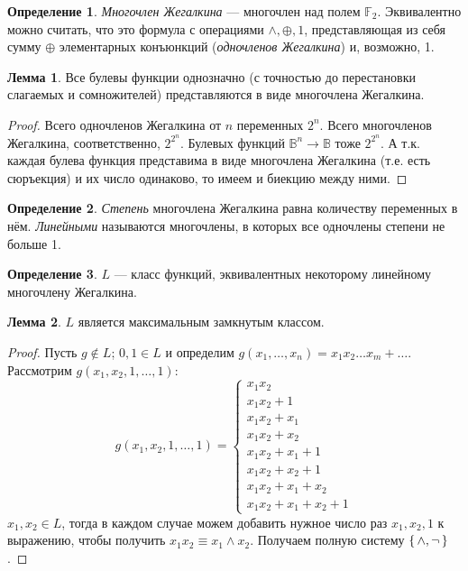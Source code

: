 \documentclass[12pt]{article}
\let\eq\equiv
\let\la\land
\let\n\neg
\let\nin\notin
\theoremstyle{definition}
\newtheorem{definition}{Определение}[section]
\theoremstyle{statement}
\theoremstyle{theorem}
\newtheorem{lemma}{Лемма}[section]
\begin{document}
\begin{definition}
  \textit{Многочлен Жегалкина} --- многочлен над полем
  $\mathbb{F}_2$. Эквивалентно можно считать, что это формула с
  операциями $\la, \oplus, 1$, представляющая из себя сумму $\oplus$
  элементарных конъюнкций (\textit{одночленов Жегалкина}) и, возможно, 1.
\end{definition}

\begin{lemma}
  Все булевы функции однозначно (с точностью до перестановки
  слагаемых и сомножителей) представляются в виде многочлена Жегалкина.
  \begin{proof}
    Всего одночленов Жегалкина от $n$ переменных $2^n$. Всего
    многочленов Жегалкина, соответственно, $2^{2^n}$. Булевых функций
    $\mathbb{B}^n \to \mathbb{B}$ тоже $2^{2^n}$. А т.к. каждая
    булева функция представима в виде многочлена Жегалкина (т.е. есть
    сюръекция) и их число одинаково, то имеем и биекцию между ними.
  \end{proof}
\end{lemma}

\begin{definition}
  \textit{Степень} многочлена Жегалкина равна количеству переменных в
  нём. \textit{Линейными} называются многочлены, в которых все
  одночлены степени не больше 1.
\end{definition}

\begin{definition}
  $L$ --- класс функций, эквивалентных некоторому линейному
  многочлену Жегалкина.
\end{definition}

\begin{lemma}
  $L$ является максимальным замкнутым классом.
  \begin{proof}
    Пусть $g \nin L$; $0, 1 \in L$ и определим $g(x_1, \dots, x_n) =
    x_1x_2\dots x_m + \dots$. Рассмотрим $g(x_1, x_2, 1, \dots, 1)$:
    \[
      g(x_1, x_2, 1, \dots, 1) =
      \begin{cases}
        x_1x_2\\
        x_1x_2 + 1\\
        x_1x_2 + x_1\\
        x_1x_2 + x_2\\
        x_1x_2 + x_1 + 1\\
        x_1x_2 + x_2 + 1\\
        x_1x_2 + x_1 + x_2\\
        x_1x_2 + x_1 + x_2 + 1
      \end{cases}
    \]
    $x_1, x_2 \in L$, тогда в каждом случае можем добавить нужное
    число раз $x_1, x_2, 1$ к выражению, чтобы получить $x_1x_2 \eq
    x_1 \land x_2$. Получаем полную систему $\set{ \land, \n }$.
  \end{proof}
\end{lemma}
\end{document}
